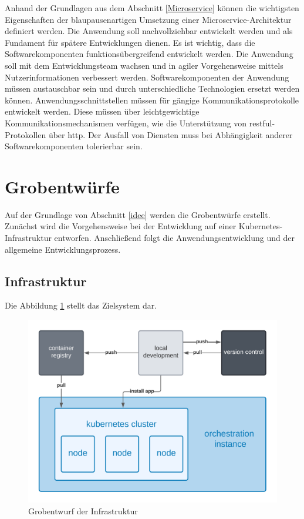 Anhand der Grundlagen aus dem Abschnitt \ref{Microservice} können die wichtigsten Eigenschaften der blaupausenartigen Umsetzung einer Microservice-Architektur definiert werden.
Die Anwendung soll nachvollziehbar entwickelt werden und als Fundament für spätere Entwicklungen dienen.
Es ist wichtig, dass die Softwarekomponenten funktionsübergreifend entwickelt werden.
Die Anwendung soll mit dem Entwicklungsteam wachsen und in agiler Vorgehensweise mittels Nutzerinformationen verbessert werden.
Softwarekomponenten der Anwendung müssen austauschbar sein und durch unterschiedliche Technologien ersetzt werden können.
Anwendungsschnittstellen müssen für gängige Kommunikationsprotokolle entwickelt werden.
Diese müssen über leichtgewichtige Kommunikationsmechanismen verfügen, wie die Unterstützung von \acs{rest}ful-Protokollen über \acs{http}.
Der Ausfall von Diensten muss bei Abhängigkeit anderer Softwarekomponenten tolerierbar sein.

\section{Grobentwürfe}

Auf der Grundlage von Abschnitt \ref{idee} werden die Grobentwürfe erstellt.
Zunächst wird die Vorgehensweise bei der Entwicklung auf einer Kubernetes-Infrastruktur entworfen.
Anschließend folgt die Anwendungsentwicklung und der allgemeine Entwicklungsprozess.

\subsection{Infrastruktur}
Die Abbildung \ref{fig:GrobentwurfInfrastruktur} stellt das Zielsystem dar.
\begin{figure}[!htb]
  \centering
  \includegraphics[width=0.8\columnwidth]{images/GrobentwurfInfrastruktur.png}
  \caption{Grobentwurf der Infrastruktur}
  \label{fig:GrobentwurfInfrastruktur}
\end{figure}

